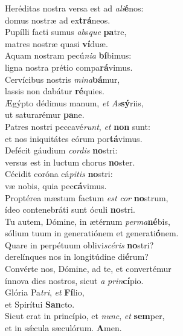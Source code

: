 \evenverse Heréditas nostra versa est ad \textit{a}\textit{li}\textbf{é}nos:~\*\\
\evenverse domus nostræ ad ex\textbf{trá}neos.\\
\oddverse Pupílli facti sumus \textit{ab}s\textit{que} \textbf{pa}tre,~\*\\
\oddverse matres nostræ quasi \textbf{ví}duæ.\\
\evenverse Aquam nostram pecú\textit{ni}\textit{a} \textbf{bí}bimus:~\*\\
\evenverse ligna nostra prétio compa\textbf{rá}vimus.\\
\oddverse Cervícibus nostris \textit{mi}\textit{na}\textbf{bá}mur,~\*\\
\oddverse lassis non dabátur \textbf{ré}quies.\\
\evenverse Ægýpto dédimus manum, \textit{et} \textit{As}\textbf{sý}riis,~\*\\
\evenverse ut saturarémur \textbf{pa}ne.\\
\oddverse Patres nostri peccavé\textit{runt}, \textit{et} \textbf{non} sunt:~\*\\
\oddverse et nos iniquitátes eórum por\textbf{tá}vimus.\\
\evenverse Defécit gáudium \textit{cor}\textit{dis} \textbf{no}stri:~\*\\
\evenverse versus est in luctum chorus \textbf{no}ster.\\
\oddverse Cécidit coróna cá\textit{pi}\textit{tis} \textbf{no}stri:~\*\\
\oddverse væ nobis, quia pec\textbf{cá}vimus.\\
\evenverse Proptérea mæstum factum \textit{est} \textit{cor} \textbf{no}strum,~\*\\
\evenverse ídeo contenebráti sunt óculi \textbf{no}stri.\\
\oddverse Tu autem, Dómine, in ætérnum \textit{per}\textit{ma}\textbf{né}bis,~\*\\
\oddverse sólium tuum in generatiónem et generati\textbf{ó}nem.\\
\evenverse Quare in perpétuum oblivi\textit{scé}\textit{ris} \textbf{no}stri?~\*\\
\evenverse derelínques nos in longitúdine di\textbf{é}rum?\\
\oddverse Convérte nos, Dómine, ad te, et convertémur~\*\\
\oddverse ínnova dies nostros, sicut \textit{a} \textit{prin}\textbf{cí}pio.\\
\evenverse Glória Pa\textit{tri}, \textit{et} \textbf{Fí}lio,~\*\\
\evenverse et Spirítui \textbf{San}cto.\\
\oddverse Sicut erat in princípio, et \textit{nunc}, \textit{et} \textbf{sem}per,~\*\\
\oddverse et in sǽcula sæculórum. \textbf{A}men.\\
